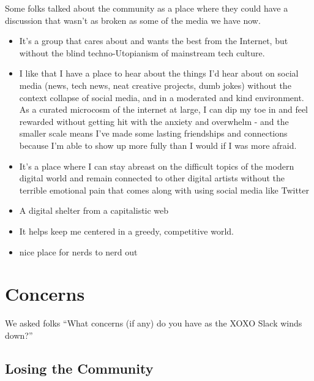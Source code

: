 \documentclass[
]{book}
\providecommand{\tightlist}{%
  \setlength{\itemsep}{0pt}\setlength{\parskip}{0pt}}
\begin{document}
Some folks talked about the community as a place where they could have a discussion that wasn't as broken as some of the media we have now.

\begin{itemize}
\tightlist
\item
  It's a group that cares about and wants the best from the Internet, but without the blind techno-Utopianism of mainstream tech culture.
\item
  I like that I have a place to hear about the things I'd hear about on social media (news, tech news, neat creative projects, dumb jokes) without the context collapse of social media, and in a moderated and kind environment. As a curated microcosm of the internet at large, I can dip my toe in and feel rewarded without getting hit with the anxiety and overwhelm - and the smaller scale means I've made some lasting friendships and connections because I'm able to show up more fully than I would if I was more afraid.
\item
  It's a place where I can stay abreast on the difficult topics of the modern digital world and remain connected to other digital artists without the terrible emotional pain that comes along with using social media like Twitter
\item
  A digital shelter from a capitalistic web
\item
  It helps keep me centered in a greedy, competitive world.
\item
  nice place for nerds to nerd out
\end{itemize}

\chapter{Concerns}\label{concerns}

We asked folks ``What concerns (if any) do you have as the XOXO Slack winds down?''

\section{Losing the Community}\label{losing-the-community}
\end{document}
